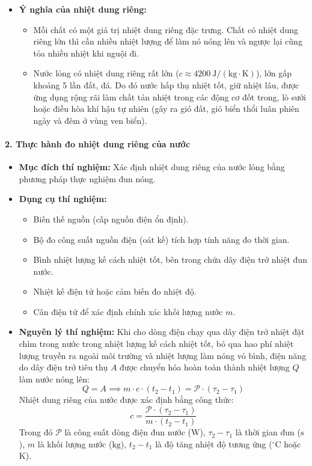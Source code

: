 \begin{itemize}
    \[
    c = \dfrac{Q}{m \cdot \Delta T}
    \]
    \item \textbf{Ý nghĩa của nhiệt dung riêng:}
    \begin{itemize}
        \item Mỗi chất có một giá trị nhiệt dung riêng đặc trưng. Chất có nhiệt dung riêng lớn thì cần nhiều nhiệt lượng để làm nó nóng lên và ngược lại cũng tỏa nhiều nhiệt khi nguội đi.
        \item Nước lỏng có nhiệt dung riêng rất lớn ($c \approx 4200\ \mathrm{J/(kg\cdot K)}$), lớn gấp khoảng 5 lần đất, đá. Do đó nước hấp thụ nhiệt tốt, giữ nhiệt lâu, được ứng dụng rộng rãi làm chất tản nhiệt trong các động cơ đốt trong, lò sưởi hoặc điều hòa khí hậu tự nhiên (gây ra gió đất, gió biển thổi luân phiên ngày và đêm ở vùng ven biển).
    \end{itemize}
\end{itemize}

\paragraph{2. Thực hành đo nhiệt dung riêng của nước}
\begin{itemize}
    \item \textbf{Mục đích thí nghiệm:} Xác định nhiệt dung riêng của nước lỏng bằng phương pháp thực nghiệm đun nóng.
    \item \textbf{Dụng cụ thí nghiệm:}
    \begin{itemize}
        \item Biến thế nguồn (cấp nguồn điện ổn định).
        \item Bộ đo công suất nguồn điện (oát kế) tích hợp tính năng đo thời gian.
        \item Bình nhiệt lượng kế cách nhiệt tốt, bên trong chứa dây điện trở nhiệt đun nước.
        \item Nhiệt kế điện tử hoặc cảm biến đo nhiệt độ.
        \item Cân điện tử để xác định chính xác khối lượng nước $m$.
    \end{itemize}
    \item \textbf{Nguyên lý thí nghiệm:}
    Khi cho dòng điện chạy qua dây điện trở nhiệt đặt chìm trong nước trong nhiệt lượng kế cách nhiệt tốt, bỏ qua hao phí nhiệt lượng truyền ra ngoài môi trường và nhiệt lượng làm nóng vỏ bình, điện năng do dây điện trở tiêu thụ $A$ được chuyển hóa hoàn toàn thành nhiệt lượng $Q$ làm nước nóng lên:
    \[
    Q = A \implies m \cdot c \cdot (t_2 - t_1) = \mathscr{P} \cdot (\tau_2 - \tau_1)
    \]
    Nhiệt dung riêng của nước được xác định bằng công thức:
    \[
    c = \dfrac{\mathscr{P} \cdot (\tau_2 - \tau_1)}{m \cdot (t_2 - t_1)}
    \]
    Trong đó $\mathscr{P}$ là công suất dòng điện đun nước ($\mathrm{W}$), $\tau_2 - \tau_1$ là thời gian đun ($\mathrm{s}$), $m$ là khối lượng nước ($\mathrm{kg}$), $t_2 - t_1$ là độ tăng nhiệt độ tương ứng ($\mathrm{^\circ C}$ hoặc $\mathrm{K}$).
\end{itemize}

